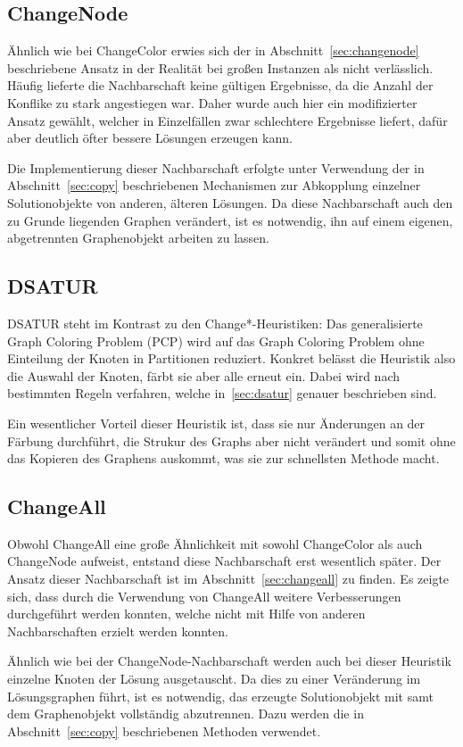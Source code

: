\subsection{ChangeNode}
Ähnlich wie bei ChangeColor erwies sich der in Abschnitt~\ref{sec:changenode} beschriebene Ansatz in der Realität bei großen Instanzen als nicht verlässlich. Häufig lieferte die Nachbarschaft keine gültigen
Ergebnisse, da die Anzahl der Konflike zu stark angestiegen war. Daher wurde auch hier ein modifizierter Ansatz gewählt, welcher in Einzelfällen zwar schlechtere Ergebnisse liefert, dafür aber deutlich öfter
bessere Lösungen erzeugen kann.

Die Implementierung dieser Nachbarschaft erfolgte unter Verwendung der in Abschnitt~\ref{sec:copy} beschriebenen Mechanismen zur Abkopplung einzelner Solutionobjekte von anderen, älteren Lösungen. Da diese 
Nachbarschaft auch den zu Grunde liegenden Graphen verändert, ist es notwendig, ihn auf einem eigenen, abgetrennten Graphenobjekt arbeiten zu lassen. 

\subsection{DSATUR}
DSATUR steht im Kontrast zu den Change*-Heuristiken: Das generalisierte Graph Coloring Problem (PCP) wird auf das Graph Coloring Problem ohne Einteilung der Knoten in Partitionen reduziert. Konkret belässt die Heuristik also die Auswahl der Knoten, färbt sie aber alle erneut ein. Dabei wird nach be\-stim\-mt\-en Regeln verfahren, welche in~\ref{sec:dsatur} genauer beschrieben sind.

Ein wesentlicher Vorteil dieser Heuristik ist, dass sie nur Änderungen an der Färbung durchführt, die Strukur des Graphs aber nicht verändert und somit ohne das Kopieren des Graphens auskommt, was sie zur schnellsten Methode macht.

\subsection{ChangeAll}
Obwohl ChangeAll eine große Ähnlichkeit mit sowohl ChangeColor als auch ChangeNode aufweist, entstand diese Nachbarschaft erst wesentlich später. Der Ansatz dieser Nachbarschaft ist im Abschnitt~\ref{sec:changeall} zu finden.
Es zeigte sich, dass durch die Verwendung von ChangeAll weitere Verbesserungen durchgeführt werden konnten, welche nicht mit Hilfe von anderen 
Nachbarschaften erzielt werden konnten.

Ähnlich wie bei der ChangeNode-Nachbarschaft werden auch bei dieser Heuristik einzelne Knoten der Lösung ausgetauscht. Da dies zu einer Veränderung im Lösungsgraphen führt, ist es notwendig, das erzeugte
Solutionobjekt mit samt dem Graphenobjekt vollständig abzutrennen. Dazu werden die in Abschnitt~\ref{sec:copy} beschriebenen Methoden verwendet.

